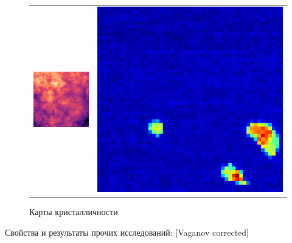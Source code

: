 	\begin{figure}[ht]\center
\begin{tabular}{cc}
\includegraphics[width=0.5\linewidth]{fig/map-1.png}
&
\includegraphics[width=0.5\linewidth]{fig/map-2.png}
\end{tabular}
\caption{Карты кристалличности}
\end{figure}
	
	

	
	
	
	Свойства и результаты прочих исследований:
	[Vaganov corrected]